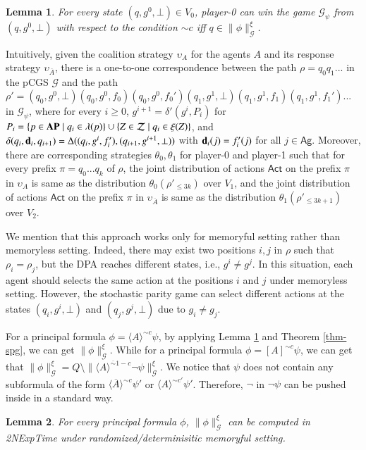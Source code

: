 \documentclass[letterpaper]{article}
\newcommand{\AP}{{\bf AP}}
\newcommand{\calZ}{\mathcal{Z}}
\newcommand{\calM}{\mathcal{G}}
\newcommand{\Ag}{\textsf{Ag}}
\newcommand{\Act}{\textsf{Act}}
\newcommand{\nA}{\overline{A}}
\newcommand{\dec}{{\bf d}}
\newcommand{\opA}[1]{\langle{#1}\rangle}
\newcommand{\opUA}[1]{[{#1}]}
\newcommand {\semantics}[1]{\|{#1}\|}  %
\newtheorem{lemma}{Lemma}
\begin{document}
\begin{lemma}
\label{lemma-mc2spg}
For every state $(q,g^0,\bot)\in V_0$, player-0 can win the game $\calM_\psi$ from $(q,g^0,\bot)$ with respect to the condition $\sim c$ iff $q\in \semantics{\phi}_\calM^\xi$.
\end{lemma}

Intuitively, given the coalition strategy $\upsilon_A$ for the agents $A$ and its response strategy $\upsilon_{\nA}$,
there is a one-to-one correspondence between the path $\rho=q_0q_1...$ in the pCGS $\calM$ and the path
$\rho'=(q_0,g^0,\bot)(q_0,g^0,f_{0})(q_0,g^0,f_{0}')(q_1,g^1,\bot)(q_1,g^1,f_{1})(q_1,g^1,f_{1}')...$ in $\calM_\psi$, where
for every $i\geq 0$, $g^{i+1}=\delta'(g^i,P_i)$ for $P_i=\{p\in\AP\mid q_i\in\lambda(p)\}\cup \{Z\in\calZ\mid q_i\in\xi(Z)\}$,
and $\delta(q_i,\dec_i, q_{i+1})=\Delta((q_i,g^i,f_i'),(q_{i+1},g^{i+1},\bot))$ with $\dec_i(j)=f_i'(j)$ for all $j\in\Ag$.
Moreover, there are corresponding strategies $\theta_0,\theta_1$ for player-0 and player-1 such that for every prefix $\pi=q_0...q_k$ of $\rho$,
the joint distribution of actions $\Act$ on the prefix $\pi$ in $\upsilon_A$ is same as
the distribution $\theta_0(\rho'_{\leq 3k})$ over $V_1$, and the joint distribution of actions $\Act$ on the prefix $\pi$ in $\upsilon_{\nA}$ is same as
the distribution $\theta_1(\rho'_{\leq 3k+1})$ over $V_2$.

We mention that this approach works only for memoryful setting rather than memoryless setting. Indeed,
there may exist two positions $i,j$ in $\rho$ such that $\rho_i=\rho_j$, but the DPA reaches different states, i.e., $g^i\neq g^j$.
In this situation, each agent should selects the same action at the positions $i$ and $j$ under memoryless setting. However,
the stochastic parity game can select different actions at the states $(q_i,g^i,\bot)$ and $(q_j,g^j,\bot)$
due to $g_i\neq g_j$.


For a principal formula $\phi=\opA{A}^{\sim c}\psi$, by applying Lemma \ref{lemma-mc2spg} and Theorem \ref{thm-spg}, we can get $\semantics{\phi}_\calM^\xi$.
While for a principal formula $\phi=\opUA{A}^{\sim c}\psi$, we can get that $\semantics{\phi}_\calM^\xi=Q\setminus  
\semantics{\opA{A}^{\overline{\sim} 1-c}\neg \psi}_\calM^\xi$. We notice that $\psi$ does not contain any subformula of
the form $\opA{\nA}^{\sim c}\psi'$ or $\opA{A}^{\sim c'}\psi'$. Therefore, $\neg$ in $\neg\psi$ can be pushed inside in a standard way. 
\begin{lemma}
\label{lemma-mcpf}
For every principal formula $\phi$,
$\semantics{\phi}_\calM^\xi$ can be computed in {\sc 2NExpTime} under randomized/determinisitic memoryful setting.
\end{lemma}
\end{document}
